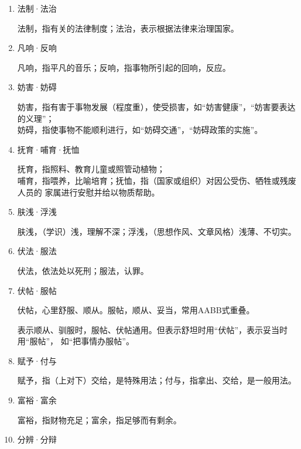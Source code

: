\documentclass[final,oneside]{ctexbook}
\begin{document}
\begin{enumerate}
    发奋，强调精神振作；发愤，突出精神受到刺激而产生向上的内动力。

    发奋，使用的范围要比“发愤”大，可以指个人，也可以指群体或国家；“发愤”一般指个
    人。

    使用上，发奋可以说“奋发”，而发愤则不能说“愤发”。

  \item 法制·法治

    法制，指有关的法律制度；法治，表示根据法律来治理国家。

  \item 凡响·反响

    凡响，指平凡的音乐；反响，指事物所引起的回响，反应。

  \item 妨害·妨碍

    妨害，指有害于事物发展（程度重），使受损害，如“妨害健康”，“妨害要表达的义理”；\\
    妨碍，指使事物不能顺利进行，如“妨碍交通”，“妨碍政策的实施”。

  \item 抚育·哺育·抚恤

    抚育，指照料、教育儿童或照管动植物；\\
    哺育，指喂养，比喻培育；抚恤，指（国家或组织）对因公受伤、牺牲或残废人员的
    家属进行安慰并给以物质帮助。

  \item 肤浅·浮浅

    肤浅，（学识）浅，理解不深；浮浅，（思想作风、文章风格）浅薄、不切实。

  \item 伏法·服法

    伏法，依法处以死刑；服法，认罪。

  \item 伏帖·服帖

    伏帖，心里舒服、顺从。服帖，顺从、妥当，常用AABB式重叠。

    表示顺从、驯服时，服帖、伏帖通用。但表示舒坦时用“伏帖”，表示妥当时用“服帖”，
    如“把事情办服帖”。

  \item 赋予·付与

    赋予，指（上对下）交给，是特殊用法；付与，指拿出、交给，是一般用法。

  \item 富裕·富余

    富裕，指财物充足；富余，指足够而有剩余。

  \item 分辨·分辩


\end{enumerate}
\end{document}
